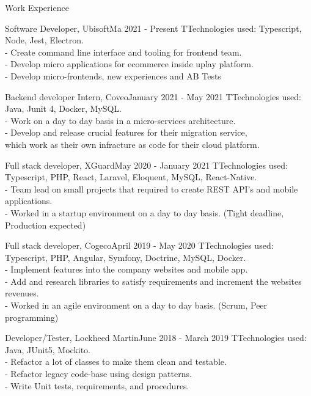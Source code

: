 \documentclass[10pt]{resume} %
\begin{document}
\begin{rSection}{Work Experience}

\begin{rSubsection}{Software Developer, Ubisoft}{Ma 2021 - Present}{}
TTechnologies used: Typescript, Node, Jest, Electron.\\
- Create command line interface and tooling for frontend team.\\
- Develop micro applications for ecommerce inside uplay platform. \\
- Develop micro-frontends, new experiences and AB Tests
\end{rSubsection}

\begin{rSubsection}{Backend developer Intern, Coveo}{January 2021 - May 2021}{}
TTechnologies used: Java, Junit 4, Docker, MySQL.\\
- Work on a day to day basis in a micro-services architecture.\\
- Develop and release crucial features for their migration service, \\
which work as their own infracture as code for their cloud platform.
\end{rSubsection}

\begin{rSubsection}{Full stack developer, XGuard}{May 2020 - January 2021}{}
TTechnologies used: Typescript, PHP, React, Laravel, Eloquent, MySQL, React-Native.\\
- Team lead on small projects that required to create REST API's and mobile applications.\\
- Worked in a startup environment on a day to day basis. (Tight deadline, Production expected)
\end{rSubsection}

\begin{rSubsection}{Full stack developer, Cogeco}{April 2019 - May 2020}{}
TTechnologies used: Typescript, PHP, Angular, Symfony, Doctrine, MySQL, Docker.\\
- Implement features into the company websites and mobile app.\\
- Add and research libraries to satisfy requirements and increment the websites revenues.\\
- Worked in an agile environment on a day to day basis. (Scrum, Peer programming)
\end{rSubsection}

\begin{rSubsection}{Developer/Tester, Lockheed Martin}{June 2018 - March 2019}{}   TTechnologies used: Java, JUnit5, Mockito.\\
- Refactor a lot of classes to make them clean and testable.\\
- Refactor legacy code-base using design patterns.\\
- Write Unit tests, requirements, and procedures.
\end{rSubsection}

\end{rSection}
\end{document}
